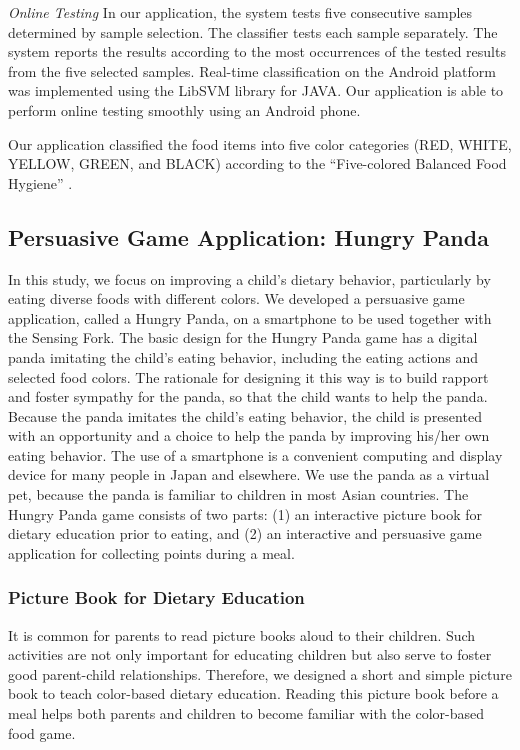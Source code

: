 \textit{Online Testing}
\newline
In our application, the system tests five consecutive samples determined by sample selection. 
The classifier tests each sample separately. 
The system reports the results according to the most occurrences of the tested results from the five selected samples. 
Real-time classification on the Android platform was implemented using the LibSVM library for JAVA. 
Our application is able to perform online testing smoothly using an Android phone.

Our application classified the food items into five color categories (RED, WHITE, YELLOW, GREEN, 
and BLACK) according to the ``Five-colored Balanced Food Hygiene'' \cite{goshoku}. 

\subsection{Persuasive Game Application: Hungry Panda}
In this study, we focus on improving a child's dietary behavior, 
particularly by eating diverse foods with different colors. 
We developed a persuasive game application, 
called a Hungry Panda, on a smartphone to be used together with the Sensing Fork. 
The basic design for the Hungry Panda game has a digital panda imitating the child's eating behavior, 
including the eating actions and selected food colors. 
The rationale for designing it this way is to build rapport and foster sympathy for the panda, 
so that the child wants to help the panda. 
Because the panda imitates the child's eating behavior, 
the child is presented with an opportunity and a choice to help the panda 
by improving his/her own eating behavior. 
The use of a smartphone is a convenient computing and display device for many people in Japan 
and elsewhere. 
We use the panda as a virtual pet, because the panda is familiar to children 
in most Asian countries. 
The Hungry Panda game consists of two parts: 
(1) an interactive picture book for dietary education prior to eating, and 
(2) an interactive and persuasive game application for collecting points during a meal. 

\subsubsection{Picture Book for Dietary Education}
It is common for parents to read picture books aloud to their children. 
Such activities are not only important for educating children 
but also serve to foster good parent-child relationships. 
Therefore, we designed a short and simple picture book to teach color-based dietary education. 
Reading this picture book before a meal helps both parents and children to become familiar with the color-based food game. 


